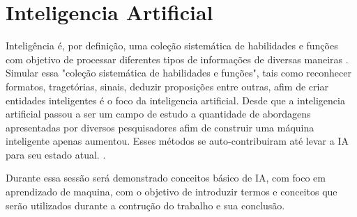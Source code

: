 \section{Inteligencia Artificial}

Inteligência é, por definição, uma coleção sistemática de habilidades e funções com objetivo de processar diferentes tipos de informações de diversas maneiras \cite[49]{guilford1982cognitive}. Simular essa "coleção sistemática de habilidades e funções", tais como reconhecer formatos, tragetórias, sinais, deduzir proposições entre outras, afim de criar entidades inteligentes é o foco da inteligencia artificial. Desde que a inteligencia artificial passou a ser um campo de estudo a quantidade de abordagens apresentadas por diversos pesquisadores afim de construir uma máquina inteligente apenas aumentou. Esses métodos se auto-contribuiram até levar a IA para seu estado atual. \cite[1-2]{russell2003artificial}.

Durante essa sessão será demonstrado conceitos básico de IA, com foco em aprendizado de maquina, com o objetivo de introduzir termos e conceitos que serão utilizados durante a contrução do trabalho e sua conclusão.




